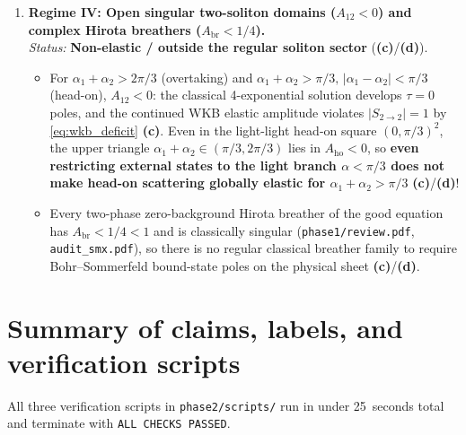 \documentclass[11pt,a4paper]{article}
\newcommand{\Lc}{\textsf{\textbf{(c)}}\xspace}
\newcommand{\Ld}{\textsf{\textbf{(d)}}\xspace}
\theoremstyle{remark}
\begin{document}
\begin{enumerate}
\item \textbf{Regime IV: Open singular two-soliton domains ($A_{12} < 0$) and complex Hirota breathers ($A_{\mathrm{br}} < 1/4$).}\\
\emph{Status:} \textbf{Non-elastic / outside the regular soliton sector} (\Lc/\Ld).
\begin{itemize}
\item For $\alpha_1+\alpha_2 > 2\pi/3$ (overtaking) and $\alpha_1+\alpha_2 > \pi/3,\,|\alpha_1-\alpha_2| < \pi/3$
(head-on), $A_{12} < 0$: the classical 4-exponential solution develops $\tau=0$
poles, and the continued WKB elastic amplitude violates $|S_{2\to 2}|=1$ by
\eqref{eq:wkb_deficit} \Lc. Even in the light-light head-on square $(0,\pi/3)^2$,
the upper triangle $\alpha_1+\alpha_2 \in (\pi/3,2\pi/3)$ lies in $A_{\mathrm{ho}} < 0$,
so \textbf{even restricting external states to the light branch $\alpha<\pi/3$
does not make head-on scattering globally elastic for $\alpha_1+\alpha_2 > \pi/3$} \Lc/\Ld!
\item Every two-phase zero-background Hirota breather of the good equation has
$A_{\mathrm{br}} < 1/4 < 1$ and is classically singular (\texttt{phase1/\allowbreak review.pdf},
\texttt{audit\_smx.pdf}), so there is no regular classical breather family to
require Bohr--Sommerfeld bound-state poles on the physical sheet \Lc/\Ld.
\end{itemize}
\end{enumerate}

\section{Summary of claims, labels, and verification scripts}
\label{sec:summary_table}

All three verification scripts in \texttt{phase2/\allowbreak scripts/} run in
under 25~seconds total and terminate with \texttt{ALL CHECKS PASSED}.
\end{document}

